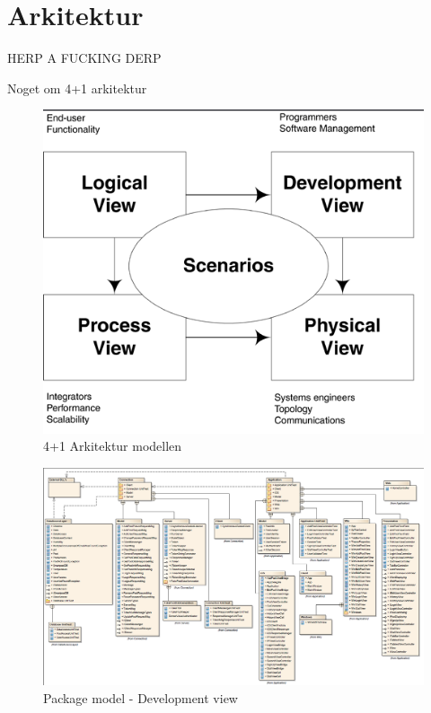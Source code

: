\chapter{Arkitektur}

HERP A FUCKING DERP


Noget om 4+1 arkitektur

\begin{figure}
\centering
\includegraphics[width=0.7\linewidth]{figs/arkitektur/41model}
\caption{4+1 Arkitektur modellen}
\label{fig:41model}
\end{figure}


\begin{landscape}
\begin{figure}
\centering
\includegraphics[width=\linewidth]{figs/arkitektur/packageDiagram.PNG}
\caption{Package model - Development view}
\label{fig:packageDiagram}
\end{figure}
\end{landscape}


